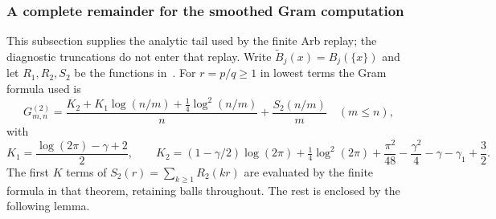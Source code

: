\documentclass[11pt]{article}
\theoremstyle{remark}
\begin{document}
\subsubsection*{A complete remainder for the smoothed Gram computation}
\label{sec:ns61-gram-remainder}

This subsection supplies the analytic tail used by the finite Arb replay;
the diagnostic truncations do not enter that replay. Write
$\widetilde B_j(x)=B_j(\{x\})$ and let $R_1,R_2,S_2$ be the
functions in~\cite[Theorem 2.1]{Ehm2024}. For $r=p/q\geq1$ in lowest
terms the Gram formula used is
\[
 G^{(2)}_{m,n}=\frac{K_2+K_1\log(n/m)+\tfrac14\log^2(n/m)}n
                  +\frac{S_2(n/m)}m\quad(m\leq n),
\]
with
\[
 K_1=\frac{\log(2\pi)-\gamma+2}{2},\qquad
 K_2=(1-\gamma/2)\log(2\pi)+\tfrac14\log^2(2\pi)
       +\frac{\pi^2}{48}-\frac{\gamma^2}{4}-\gamma-\gamma_1+\frac32.
\]
The first $K$ terms of $S_2(r)=\sum_{k\geq1}R_2(kr)$ are evaluated
by the finite formula in that theorem, retaining balls throughout.
The rest is enclosed by the following lemma.
\end{document}
